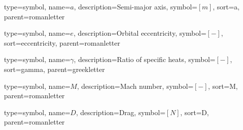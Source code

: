 %

{
type=symbol, %
name={\ensuremath{a}}, %
description={Semi-major axis}, %
symbol={$\left[m\right]$}, %
sort=a, %
parent=romanletter %
}

{
type=symbol, %
name={\ensuremath{e}}, %
description={Orbital eccentricity}, %
symbol={$\left[-\right]$}, %
sort=eccentricity, %
parent=romanletter %
}

{
type=symbol, %
name={\ensuremath{\gamma}}, %
description={Ratio of specific heats}, %
symbol={$\left[-\right]$}, %
sort=gamma, %
parent=greekletter %
}

{
type=symbol, %
name={\ensuremath{M}}, %
description={Mach number}, %
symbol={$\left[-\right]$}, %
sort=M, %
parent=romanletter %
}

{
type=symbol, %
name={\ensuremath{D}}, %
description={Drag}, %
symbol={$\left[N\right]$}, %
sort=D, %
parent=romanletter %
}

